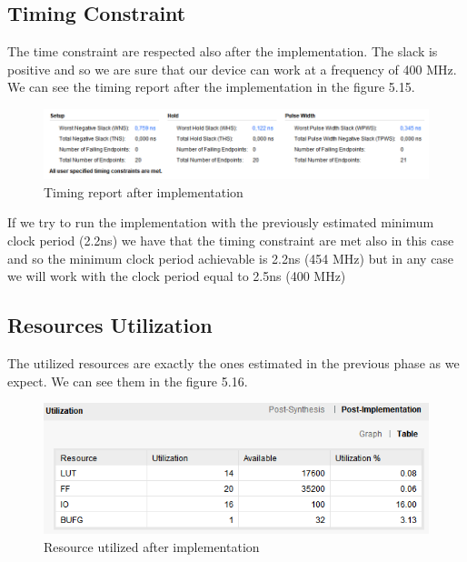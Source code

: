\documentclass[a4paper]{report}
\begin{document}
\subsection{Timing Constraint}
The time constraint are respected also after the implementation. The slack is positive and so we are sure that our device can work at a frequency of 400 MHz. We can see the timing report after the implementation in the figure 5.15.

\begin{figure}[htpb]
	\centering
	\includegraphics[scale=0.7]{img/vivado/implementation_timing.png}
	\caption{Timing report after implementation}
\end{figure}

\noindent If we try to run the implementation with the previously estimated minimum clock period (2.2ns) we have that the timing constraint are met also in this case and so the minimum clock period achievable is 2.2ns (454 MHz) but in any case we will work with the clock period equal to 2.5ns (400 MHz)
\subsection{Resources Utilization}
The utilized resources are exactly the ones estimated in the previous phase as we expect. We can see them in the figure 5.16.
\begin{figure}[htpb]
	\centering
	\includegraphics[scale=0.7]{img/vivado/utilization.png}
	\caption{Resource utilized after implementation}
\end{figure}
\end{document}
